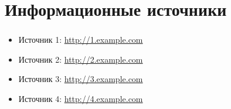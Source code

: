 
\section{Информационные источники}

\begin{frame}
\frametitle{\insertsection}
\begin{itemize}
	\item Источник 1: \url{http://1.example.com}
	\item Источник 2: \url{http://2.example.com}
	\item Источник 3: \url{http://3.example.com}
	\item Источник 4: \url{http://4.example.com}
\end{itemize}
\end{frame}


\frame[plain]{\titlepage} %
